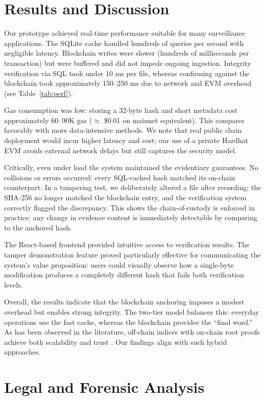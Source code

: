 \documentclass[conference]{IEEEtran}
\begin{document}
\section{Results and Discussion}

Our prototype achieved real-time performance suitable for many surveillance applications. The SQLite cache handled hundreds of queries per second with negligible latency. Blockchain writes were slower (hundreds of milliseconds per transaction) but were buffered and did not impede ongoing ingestion. Integrity verification via SQL took under 10 ms per file, whereas confirming against the blockchain took approximately 150--250 ms due to network and EVM overhead (see Table~\ref{tab:perf}).

Gas consumption was low: storing a 32-byte hash and short metadata cost approximately 60--90K gas ($\approx$ \$0.01 on mainnet equivalent). This compares favorably with more data-intensive methods. We note that real public chain deployment would incur higher latency and cost; our use of a private Hardhat EVM avoids external network delays but still captures the security model.

Critically, even under load the system maintained the evidentiary guarantees. No collisions or errors occurred: every SQL-cached hash matched its on-chain counterpart. In a tampering test, we deliberately altered a file after recording; the SHA-256 no longer matched the blockchain entry, and the verification system correctly flagged the discrepancy. This shows the chain-of-custody is enforced in practice: any change in evidence content is immediately detectable by comparing to the anchored hash.

The React-based frontend provided intuitive access to verification results. The tamper demonstration feature proved particularly effective for communicating the system's value proposition: users could visually observe how a single-byte modification produces a completely different hash that fails both verification levels.

Overall, the results indicate that the blockchain anchoring imposes a modest overhead but enables strong integrity. The two-tier model balances this: everyday operations use the fast cache, whereas the blockchain provides the ``final word.'' As has been observed in the literature, off-chain indices with on-chain root proofs achieve both scalability and trust \cite{b3}. Our findings align with such hybrid approaches.

\section{Legal and Forensic Analysis}
\end{document}
